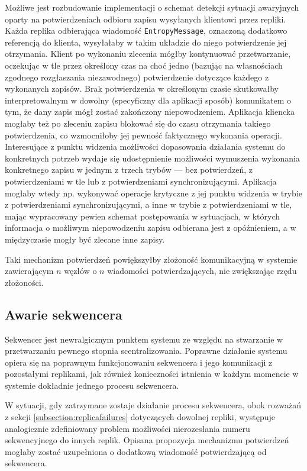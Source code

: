 Możliwe jest rozbudowanie implementacji o schemat detekcji sytuacji awaryjnych oparty na potwierdzeniach odbioru zapisu wysyłanych klientowi przez repliki. Każda replika odbierająca wiadomość \texttt{EntropyMessage}, oznaczoną dodatkowo referencją do klienta, wysyłałaby w takim układzie do niego potwierdzenie jej otrzymania. Klient po wykonaniu zlecenia mógłby kontynuować przetwarzanie, oczekując w tle przez określony czas na choć jedno (bazując na własnościach zgodnego rozgłaszania niezawodnego) potwierdzenie dotyczące każdego z wykonanych zapisów. Brak potwierdzenia w określonym czasie skutkowałby interpretowalnym w dowolny (specyficzny dla aplikacji sposób) komunikatem o tym, że dany zapis mógł zostać zakończony niepowodzeniem. Aplikacja kliencka mogłaby też po zleceniu zapisu blokować się do czasu otrzymania takiego potwierdzenia, co wzmocniłoby jej pewność faktycznego wykonania operacji. Interesujące z punktu widzenia możliwości dopasowania działania systemu do konkretnych potrzeb wydaje się udostępnienie możliwości wymuszenia wykonania konkretnego zapisu w jednym z trzech trybów --- bez potwierdzeń, z potwierdzeniami w tle lub z potwierdzeniami synchronizującymi. Aplikacja mogłaby wtedy np. wykonywać operacje krytyczne z jej punktu widzenia w trybie z potwierdzeniami synchronizującymi, a inne w trybie z potwierdzeniami w tle, mając wypracowany pewien schemat postępowania w sytuacjach, w których informacja o możliwym niepowodzeniu zapisu odbierana jest z opóźnieniem, a w międzyczasie mogły być zlecane inne zapisy.

Taki mechanizm potwierdzeń powiększyłby złożoność komunikacyjną w systemie zawierającym $n$ węzłów o $n$ wiadomości potwierdzających, nie zwiększając rzędu złożoności.

\subsection{Awarie sekwencera} \label{subsection:sequencerfailures}

Sekwencer jest newralgicznym punktem systemu ze względu na stwarzanie w przetwarzaniu pewnego stopnia scentralizowania. Poprawne działanie systemu opiera się na poprawnym funkcjonowaniu sekwencera i jego komunikacji z pozostałymi replikami, jak również konieczności istnienia w każdym momencie w systemie dokładnie jednego procesu sekwencera.

W sytuacji, gdy zatrzymane zostaje działanie procesu sekwencera, obok rozważań z sekcji \ref{subsection:replicafailures} dotyczących dowolnej repliki, występuje analogicznie zdefiniowany problem możliwości nierozesłania numeru sekwencyjnego do innych replik. Opisana propozycja mechanizmu potwierdzeń mogłaby zostać uzupełniona o dodatkową wiadomość potwierdzającą od sekwencera.

